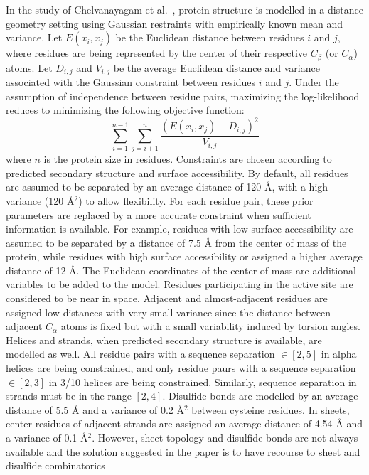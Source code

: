 In the study of Chelvanayagam et al.~\cite{chelvanayagam1998combinatorial}, protein structure is modelled
in a distance geometry setting using Gaussian restraints with empirically known mean and variance.
Let $E(x_i, x_j)$ be the Euclidean distance between residues $i$ and $j$, where residues are being represented
by the center of their respective $C_{\beta}$ (or $C_{\alpha}$) atoms.
Let $D_{i, j}$ and $V_{i, j}$ be the average Euclidean distance and variance associated with the
Gaussian constraint between residues $i$ and $j$. Under the assumption of independence between
residue pairs, maximizing the log-likelihood reduces to minimizing the following objective function:
\begin{equation}
    \sum\limits_{i=1}^{n-1} \sum\limits_{j=i+1}^n \frac{(E(x_i, x_j) - D_{i, j})^2}{V_{i, j}}
\end{equation}
where $n$ is the protein size in residues. Constraints are chosen according to predicted secondary
structure and surface accessibility. By default, all residues are assumed to be separated by an average distance
of 120 \AA{}, with a high variance (120 \AA{}$^2$) to allow flexibility.
For each residue pair, these prior parameters are replaced by a more accurate constraint when sufficient
information is available. For example, residues with low surface accessibility are assumed to be separated
by a distance of 7.5 \AA{} from the center of mass of the protein, while residues with high surface accessibility
or assigned a higher average distance of 12 \AA{}. The Euclidean coordinates of the center of mass are additional
variables to be added to the model. Residues participating in the active site are considered to be near in space.
Adjacent and almost-adjacent residues are assigned low distances with very small variance since the distance
between adjacent $C_{\alpha}$ atoms is fixed but with a small variability induced by torsion angles.
Helices and strands, when predicted secondary structure is available, are modelled as well.
All residue pairs with a sequence separation $\in [2, 5]$ in alpha helices are being constrained,
and only residue paurs with a sequence separation $\in [2, 3]$ in 3/10 helices are being constrained.
Similarly, sequence separation in strands must be in the range $[2, 4]$.
Disulfide bonds are modelled by an average distance of 5.5 \AA{} and a variance of 0.2 \AA{}$^2$ between cysteine
residues. In sheets, center residues of adjacent strands are assigned an average distance of 4.54 \AA{} and a
variance of 0.1 \AA{}$^2$.
However, sheet topology and disulfide bonds are not always available and the solution suggested in the paper
is to have recourse to sheet and disulfide combinatorics

